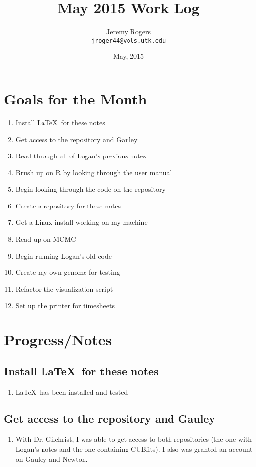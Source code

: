 \documentclass[12 pt]{article}
\title{May 2015 Work Log}
\author{Jeremy Rogers \\
	\texttt{jroger44@vols.utk.edu}}
\date{May, 2015}
\begin{document}
	\maketitle
	
	\tableofcontents
	
	\section{Goals for the Month}
	\begin{enumerate}
		\item Install \LaTeX\ for these notes
		\item Get access to the repository and Gauley
		\item Read through all of Logan's previous notes
		\item Brush up on R by looking through the user manual
		\item Begin looking through the code on the repository
		\item Create a repository for these notes
		\item Get a Linux install working on my machine
		\item Read up on MCMC
		\item Begin running Logan's old code
		\item Create my own genome for testing
		\item Refactor the visualization script
		\item Set up the printer for timesheets
	\end{enumerate}
	
	\section{Progress/Notes}
	
	\subsection{Install \LaTeX\ for these notes}
		\begin{enumerate}
			\item \LaTeX\ has been installed and tested
		\end{enumerate}
	
	\subsection{Get access to the repository and Gauley}
		 \begin{enumerate}
		 	\item With Dr. Gilchrist, I was able to get access to both repositories (the one with Logan's notes and the one containing CUBfits). I also was granted an account on Gauley and Newton.
		 \end{enumerate}
\end{document}
